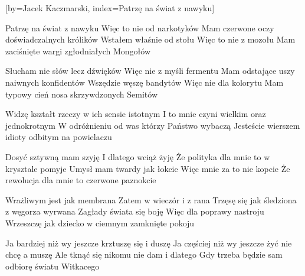 [by={Jacek Kaczmarski},
                     index={Patrzę na świat z nawyku}]
\beginverse

Patrzę na świat z nawyku
Więc to nie od narkotyków
Mam czerwone oczy doświadczalnych królików
Wstałem właśnie od stołu
Więc to nie z mozołu
Mam zaciśnięte wargi zgłodniałych Mongołów

\endverse
\beginverse

Słucham nie słów lecz dźwięków
Więc nie z myśli fermentu
Mam odstające uszy naiwnych konfidentów
Wszędzie węszę bandytów
Więc nie dla kolorytu
Mam typowy cień nosa skrzywdzonych Semitów

\endverse
\beginverse

Widzę kształt rzeczy w ich sensie istotnym
I to mnie czyni wielkim oraz jednokrotnym
W odróżnieniu od was którzy Państwo wybaczą
Jesteście wierszem idioty odbitym na powielaczu

\endverse
\beginverse

Dosyć sztywną mam szyję
I dlatego wciąż żyję
Że polityka dla mnie to w krysztale pomyje
Umysł mam twardy jak łokcie
Więc mnie za to nie kopcie
Że rewolucja dla mnie to czerwone paznokcie

\endverse
\beginverse

Wrażliwym jest jak membrana
Zatem w wieczór i z rana
Trzęsę się jak śledziona z węgorza wyrwana
Zagłady świata się boję
Więc dla poprawy nastroju
Wrzeszczę jak dziecko w ciemnym zamknięte pokoju

\endverse
\beginverse

Ja bardziej niż wy jeszcze krztuszę się i duszę
Ja częściej niż wy jeszcze żyć nie chcę a muszę
Ale tknąć się nikomu nie dam i dlatego
Gdy trzeba będzie sam odbiorę światu Witkacego

\endverse
\endsong